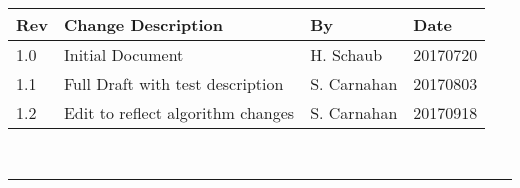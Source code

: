 \documentclass[]{BasiliskReportMemo}
\begin{document}
\makeCover

%
%
\pagestyle{empty}
{\renewcommand{\arraystretch}{2}
\noindent
\begin{longtable}{|p{0.5in}|p{3.5in}|p{1.07in}|p{0.9in}|}
\hline
{\bfseries Rev} & {\bfseries Change Description} & {\bfseries By}& {\bfseries Date} \\
\hline
1.0 & Initial Document &  H. Schaub & 20170720\\
\hline
1.1 & Full Draft with test description & S. Carnahan & 20170803\\
\hline
1.2 & Edit to reflect algorithm changes & S. Carnahan & 20170918\\
\hline

\end{longtable}
}



\newpage
\setcounter{page}{1}
\pagestyle{fancy}

\tableofcontents %
~\\ \hrule ~\\ %










	









\end{document}
